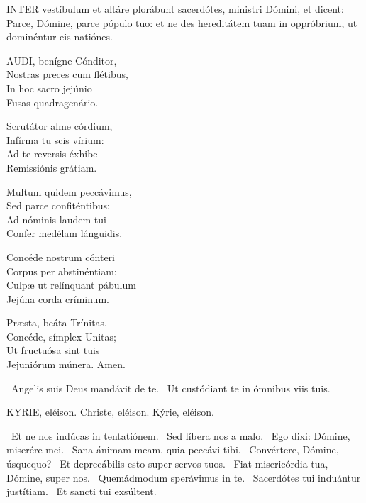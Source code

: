 

\lettrine[lines=2]{I}{NTER} vestíbulum et altáre plorábunt sacerdótes, ministri Dómini, et dicent: Parce, Dómine, parce pópulo tuo: et ne des hereditátem tuam in oppróbrium, ut dominéntur eis natiónes.


\lettrine[lines=2]{A}{UDI}, benígne Cónditor,\\
Nostras preces cum flétibus,\\
In hoc sacro jejúnio\\
Fusas quadragenário.

Scrutátor alme córdium,\\
Infírma tu scis vírium:\\
Ad te reversis éxhibe\\
Remissiónis grátiam.

Multum quidem peccávimus,\\
Sed parce confiténtibus:\\
Ad nóminis laudem tui\\
Confer medélam lánguidis.

Concéde nostrum cónteri\\
Corpus per abstinéntiam;\\
Culpæ ut relínquant pábulum\\
Jejúna corda críminum.

Præsta, beáta Trínitas,\\
Concéde, símplex Unitas;\\
Ut fructuósa sint tuis\\
Jejuniórum múnera. Amen.

\V\ Angelis suis Deus mandávit de te. \R\ Ut custódiant te in ómnibus viis tuis.




KYRIE, eléison. Christe, eléison. Kýrie, eléison.

 \V\ Et ne nos indúcas in tentatiónem. \R\ Sed líbera nos a malo. \V\ Ego dixi: Dómine, miserére mei. \R\ Sana ánimam meam, quia peccávi tibi. \V\ Convértere, Dómine, úsquequo? \R\ Et deprecábilis esto super servos tuos. \V\ Fiat misericórdia tua, Dómine, super nos. \R\ Quemádmodum sperávimus in te. \V\ Sacerdótes tui induántur justítiam. \R\ Et sancti tui exsúltent.

